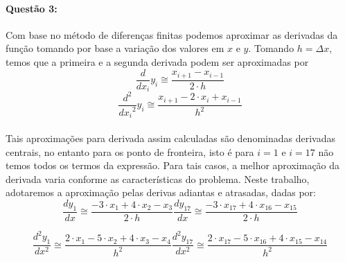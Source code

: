 \documentclass[a4paper,11pt]{article}
\begin{document}
\paragraph{Questão 3:}Com base no método de diferenças finitas podemos aproximar as derivadas da função tomando por base a variação dos valores em $x$ e $y$. Tomando $h = \Delta x$, temos que a primeira e a segunda derivada podem ser aproximadas por
\begin{equation}
\frac{d}{dx_i}y_i \cong \frac{x_{i+1} - x_{i-1}}{2\cdot h}
\end{equation}
\begin{equation}
\frac{d^2}{{dx_i}^2}y_i \cong \frac{x_{i+1} - 2\cdot x_{i} + x_{i-1}}{h^2}
\end{equation}
\paragraph{}Tais aproximações para derivada assim calculadas são denominadas  derivadas centrais, no entanto para os ponto de fronteira, isto é para $i=1$ e $i=17$ não temos todos os termos da expressão. Para tais casos, a melhor aproximação da derivada varia conforme as características do problema. Neste trabalho, adotaremos a aproximação pelas derivas adiantas e atrasadas, dadas por:
\begin{subequations}
\begin{equation}
\frac{dy_1}{dx} \cong \frac{-3\cdot x_1 + 4\cdot x_2 -x_3}{2\cdot h}
\end{equation}
\begin{equation}
\frac{dy_{17}}{dx} \cong \frac{-3\cdot x_{17} + 4\cdot x_{16} -x_{15}}{2\cdot h}
\end{equation}
\end{subequations}

\begin{subequations}
\begin{equation}
\frac{d^2y_1}{dx^2} \cong \frac{2\cdot x_1 -5\cdot x_2 +4\cdot x_3 -x_4}{h^2}
\end{equation}

\begin{equation}
\frac{d^2y_{17}}{dx^2} \cong \frac{2\cdot x_{17} -5\cdot x_{16} +4\cdot x_{15} -x_{14}}{h^2}
\end{equation}
\end{subequations}

\end{document}
